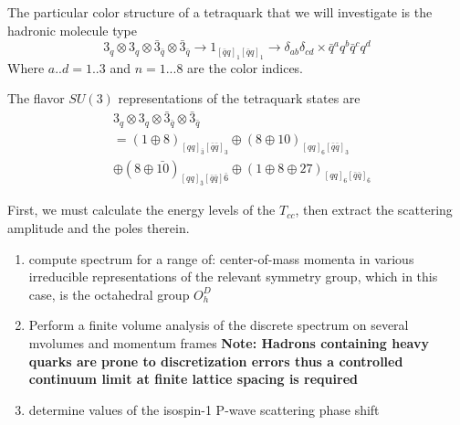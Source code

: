 The particular color structure of a tetraquark that we will investigate is the hadronic molecule type 
\begin{equation}
    3_q \otimes 3_q \otimes \bar{3}_{\bar{q}} \otimes \bar{3}_{\bar{q}} \rightarrow 1_{[\bar{q}q]_1[\bar{q}q]_1} \rightarrow \delta_{ab} \delta_{cd} \times \bar{q}^aq^b\bar{q}^cq^d 
\end{equation}
Where $a..d = 1..3$ and $n=1...8$ are the color indices. 

The flavor $SU(3)$ representations of the tetraquark states are 
\begin{align}
& 3_q \otimes 3_q \otimes \bar{3}_{\bar{q}} \otimes \bar{3}_{\bar{q}} \nonumber \\
& = (1 \oplus 8)_{[qq]_{\bar{3}}[\bar{q}\bar{q}]_3} \oplus (8 \oplus 10)_{[qq]_6[\bar{q}\bar{q}]_3} \nonumber \\
& \oplus (8 \oplus \bar{10})_{[qq]_{\bar{3}}[\bar{q}\bar{q}]\bar{6}} \oplus (1 \oplus 8 \oplus 27)_{[qq]_6[\bar{q}\bar{q}]_{\bar{6}}}
\end{align}

First, we must calculate the energy levels of the $T_{cc}$, then extract the scattering amplitude and the poles therein. 

\begin{enumerate}
    \item compute spectrum for a range of:
    \subitem center-of-mass momenta 
    \subitem in various irreducible representations of the relevant symmetry group, which in this case, is the octahedral group $O_h^D$ 
    \item Perform a finite volume analysis of the discrete spectrum on several mvolumes and momentum frames
        \subitem \textbf{Note: Hadrons containing heavy quarks are prone to discretization errors thus a controlled continuum limit at finite lattice spacing is required} 
    \item determine values of the isospin-1 P-wave scattering phase shift 
\end{enumerate}
    